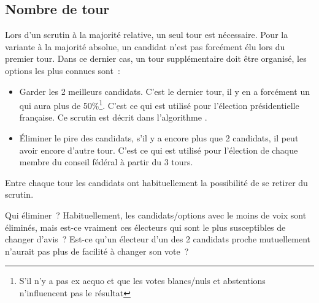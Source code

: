 \documentclass[../report]{subfiles}
\begin{document}
  \begin{algorithm}
    \caption{Scrutin majoritaire uninominal à 1 tour}%
    \label{scrutin:maj-uni-1t}
    \begin{algorithmic}[1]
      \ENDFOR{}
    \end{algorithmic}
  \end{algorithm}


  \subsection{Nombre de tour}

  Lors d'un scrutin à la majorité relative, un seul tour est nécessaire.
  Pour la variante à la majorité absolue, un candidat n'est pas forcément élu lors du
  premier tour. Dans ce dernier cas, un tour supplémentaire doit être organisé, les options
  les plus connues sont~: 
  \begin{itemize}
    \item Garder les 2 meilleurs candidats. C'est le dernier tour, il y en a forcément un 
      qui aura plus de 50\%\footnote{S'il n'y a pas ex aequo et que les votes blancs/nuls 
      et abstentions n'influencent pas le résultat}. C'est ce qui est utilisé pour l'élection
      présidentielle française. Ce scrutin est décrit dans l'algorithme .
    \item Éliminer le pire des candidats, s'il y a encore plus que 2 candidats, il peut avoir
      encore d'autre tour. C'est ce qui est utilisé pour l'élection de chaque membre du
      conseil fédéral à partir du 3 tours.
  \end{itemize}

  Entre chaque tour les candidats ont habituellement la possibilité de se retirer du scrutin.
  
  \begin{nota}{Qui éliminer~?}
    Habituellement, les candidats/options avec le moins de voix sont éliminés, mais
    est-ce vraiment ces électeurs qui sont le plus susceptibles de changer d'avis~?
    Est-ce qu'un électeur d'un des 2 candidats proche mutuellement n'aurait pas plus
    de facilité à changer son vote~?
  \end{nota}
\end{document}

